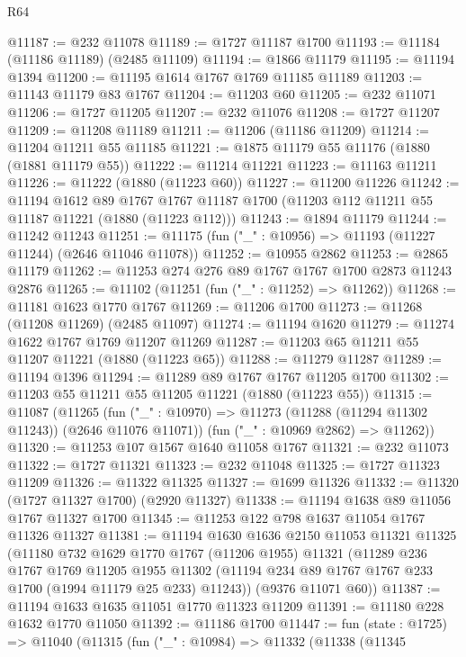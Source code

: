 \begin{lexlean}{R64}
\begin{coremodule}
@11187 := @232 @11078
@11189 := @1727 @11187 @1700
@11193 := @11184 (@11186 @11189) (@2485 @11109)
@11194 := @1866 @11179
@11195 := @11194 @1394
@11200 := @11195 @1614 @1767 @1769 @11185 @11189
@11203 := @11143 @11179 @83 @1767
@11204 := @11203 @60
@11205 := @232 @11071
@11206 := @1727 @11205
@11207 := @232 @11076
@11208 := @1727 @11207
@11209 := @11208 @11189
@11211 := @11206 (@11186 @11209)
@11214 := @11204 @11211 @55 @11185
@11221 := @1875 @11179 @55 @11176 (@1880 (@1881 @11179 @55))
@11222 := @11214 @11221
@11223 := @11163 @11211
@11226 := @11222 (@1880 (@11223 @60))
@11227 := @11200 @11226
@11242 := @11194
    @1612
    @89
    @1767
    @1767
    @11187
    @1700
    (@11203 @112 @11211 @55 @11187 @11221 (@1880 (@11223 @112)))
@11243 := @1894 @11179
@11244 := @11242 @11243
@11251 := @11175 (fun ("_" : @10956) => @11193 (@11227 @11244) (@2646 @11046 @11078))
@11252 := @10955 @2862
@11253 := @2865 @11179
@11262 := @11253 @274 @276 @89 @1767 @1767 @1700 @2873 @11243 @2876
@11265 := @11102 (@11251 (fun ("_" : @11252) => @11262))
@11268 := @11181 @1623 @1770 @1767
@11269 := @11206 @1700
@11273 := @11268 (@11208 @11269) (@2485 @11097)
@11274 := @11194 @1620
@11279 := @11274 @1622 @1767 @1769 @11207 @11269
@11287 := @11203 @65 @11211 @55 @11207 @11221 (@1880 (@11223 @65))
@11288 := @11279 @11287
@11289 := @11194 @1396
@11294 := @11289 @89 @1767 @1767 @11205 @1700
@11302 := @11203 @55 @11211 @55 @11205 @11221 (@1880 (@11223 @55))
@11315 := @11087
    (@11265
      (fun ("_" : @10970) => @11273 (@11288 (@11294 @11302 @11243)) (@2646 @11076 @11071))
      (fun ("_" : @10969 @2862) => @11262))
@11320 := @11253 @107 @1567 @1640 @11058 @1767
@11321 := @232 @11073
@11322 := @1727 @11321
@11323 := @232 @11048
@11325 := @1727 @11323 @11209
@11326 := @11322 @11325
@11327 := @1699 @11326
@11332 := @11320 (@1727 @11327 @1700) (@2920 @11327)
@11338 := @11194 @1638 @89 @11056 @1767 @11327 @1700
@11345 := @11253 @122 @798 @1637 @11054 @1767 @11326 @11327
@11381 := @11194
    @1630
    @1636
    @2150
    @11053
    @11321
    @11325
    (@11180
      @732
      @1629
      @1770
      @1767
      (@11206 @1955)
      @11321
      (@11289
        @236
        @1767
        @1769
        @11205
        @1955
        @11302
        (@11194 @234 @89 @1767 @1767 @233 @1700 (@1994 @11179 @25 @233) @11243))
      (@9376 @11071 @60))
@11387 := @11194 @1633 @1635 @11051 @1770 @11323 @11209
@11391 := @11180 @228 @1632 @1770 @11050
@11392 := @11186 @1700
@11447 := fun (state : @1725) =>
  @11040
    (@11315
      (fun ("_" : @10984) =>
      @11332
        (@11338
          (@11345

\end{coremodule}
\end{lexlean}
